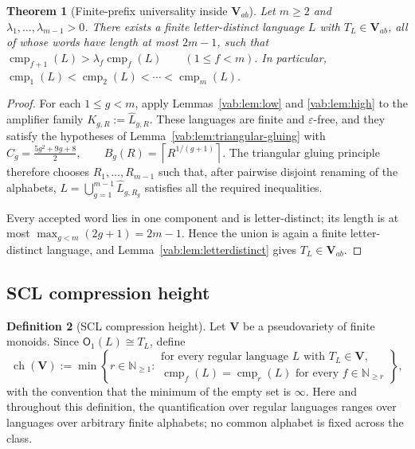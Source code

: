 \documentclass[10pt,a4paper]{article}
\newtheorem{theorem}{Theorem}[section]
\theoremstyle{definition}
\newtheorem{definition}[theorem]{Definition}
\theoremstyle{remark}
\newcommand{\cmp}{\operatorname{cmp}}
\newcommand{\Obj}{\mathsf O}
\begin{document}
\begin{theorem}[Finite-prefix universality inside \(\mathbf V_{ab}\)]
\label{vab:thm:finite-prefix}
Let \(m\ge2\) and \(\lambda_1,\ldots,\lambda_{m-1}>0\).  There exists a
finite letter-distinct language \(L\) with \(T_L\in\mathbf V_{ab}\), all of whose
words have length at most \(2m-1\), such that
\(\cmp_{f+1}(L)>\lambda_f\cmp_f(L) \qquad(1\le f<m).\)
In particular,
\(\cmp_1(L)<\cmp_2(L)<\cdots<\cmp_m(L).\)
\end{theorem}

\begin{proof}
For each \(1\le g<m\), apply Lemmas~\ref{vab:lem:low} and
\ref{vab:lem:high} to the amplifier family
\(K_{g,R}:=\widehat L_{g,R}.\)
These languages are finite and \(\varepsilon\)-free, and they satisfy the
hypotheses of Lemma~\ref{vab:lem:triangular-gluing} with
\(C_g=\frac{5g^2+9g+8}{2}, \qquad B_g(R)=\left\lceil R^{1/(g+1)}\right\rceil.\)
The triangular gluing principle therefore chooses
\(R_1,\ldots,R_{m-1}\) such that, after pairwise disjoint renaming of the
alphabets,
\(L=\bigcup_{g=1}^{m-1}\widehat L_{g,R_g}\)
satisfies all the required inequalities.

Every accepted word lies in one component and is letter-distinct; its length
is at most
\(
 \max_{g<m}(2g+1)=2m-1.
\)
Hence the union is again a finite letter-distinct language, and
Lemma~\ref{vab:lem:letterdistinct} gives
\(T_L\in\mathbf V_{ab}\).
\end{proof}


\subsection{SCL compression height}

\begin{definition}[SCL compression height]
\label{ah:def:height}
Let \(\mathbf V\) be a pseudovariety of finite monoids. Since
\(\Obj_1(L)\cong T_L\), define
\[
\operatorname{ch}(\mathbf V)
:=
\min\left\{
r\in\mathbb{N}_{\ge1}:
\begin{array}{l}
\text{for every regular language \(L\) with \(T_L\in\mathbf V\),}\\
\cmp_f(L)=\cmp_r(L)
\text{ for every }f\in\mathbb{N}_{\ge r}
\end{array}
\right\},
\]
with the convention that the minimum of the empty set is \(\infty\).
Here and throughout this definition, the quantification over regular
languages ranges over languages over arbitrary finite alphabets; no common
alphabet is fixed across the class.
\end{definition}
\end{document}
